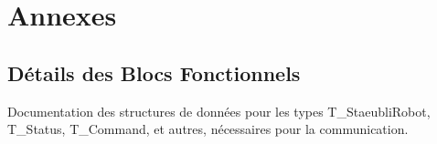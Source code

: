 
\appendix
\section{Annexes}
\subsection{Détails des Blocs Fonctionnels}
Documentation des structures de données pour les types T\_StaeubliRobot, T\_Status, T\_Command, et autres, nécessaires pour la communication.
